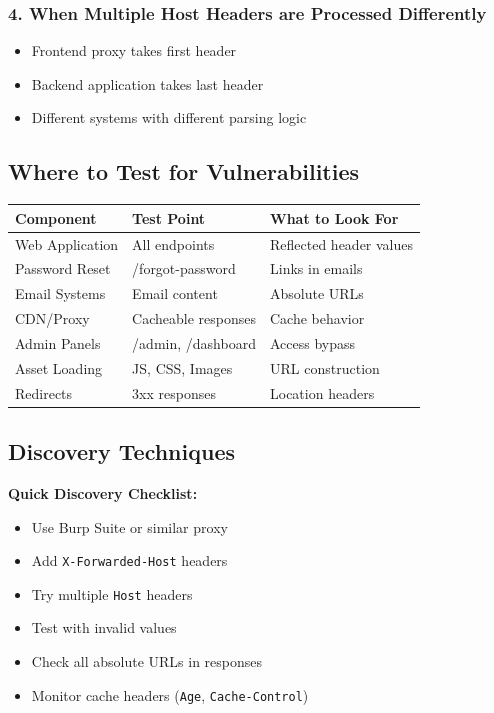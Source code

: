 \documentclass[12pt,a4paper]{article}
\newcommand{\tip}[1]{\begin{tipbox}#1\end{tipbox}}
\begin{document}
\subsubsection{4. When Multiple Host Headers are Processed Differently}
\begin{itemize}
    \item Frontend proxy takes first header
    \item Backend application takes last header
    \item Different systems with different parsing logic
\end{itemize}

\subsection{ Where to Test for Vulnerabilities}

\begin{longtable}{|p{3.5cm}|p{5cm}|p{5cm}|}
    \hline
    \textbf{Component} & \textbf{Test Point} & \textbf{What to Look For} \\
    \hline
    Web Application & All endpoints & Reflected header values \\
    \hline
    Password Reset & /forgot-password & Links in emails \\
    \hline
    Email Systems & Email content & Absolute URLs \\
    \hline
    CDN/Proxy & Cacheable responses & Cache behavior \\
    \hline
    Admin Panels & /admin, /dashboard & Access bypass \\
    \hline
    Asset Loading & JS, CSS, Images & URL construction \\
    \hline
    Redirects & 3xx responses & Location headers \\
    \hline
\end{longtable}

\subsection{Discovery Techniques}

\tip{%
\textbf{Quick Discovery Checklist:}
\begin{itemize}
    \item Use Burp Suite or similar proxy
    \item Add \texttt{X-Forwarded-Host} headers
    \item Try multiple \texttt{Host} headers
    \item Test with invalid values
    \item Check all absolute URLs in responses
    \item Monitor cache headers (\texttt{Age}, \texttt{Cache-Control})
\end{itemize}
}
\end{document}
